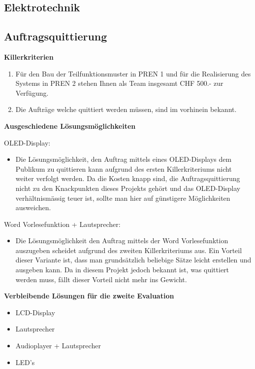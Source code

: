 \subsection{Elektrotechnik}

\subsection{Auftragsquittierung}
\textbf{Killerkriterien}
\begin{enumerate} 
    \item Für den Bau der Teilfunktionsmuster in PREN 1 und für die Realisierung des Systems in PREN 2 stehen Ihnen als Team insgesamt CHF 500.- zur Verfügung. 
	\item Die Aufträge welche quittiert werden müssen, sind im vorhinein bekannt.
\end{enumerate}

\textbf{Ausgeschiedene Lösungsmöglichkeiten} 

OLED-Display:
\begin{itemize}
    \item Die Lösungsmöglichkeit, den Auftrag mittels eines OLED-Displays dem Publikum zu quittieren kann aufgrund des ersten Killerkriteriums nicht weiter verfolgt werden. Da die Kosten knapp sind, die Auftragsquittierung nicht zu den Knackpunkten dieses Projekts gehört und das OLED-Display verhältnismässig teuer ist, sollte man hier auf günstigere Möglichkeiten ausweichen.
\end{itemize}

Word Vorlesefunktion + Lautsprecher:
\begin{itemize}
    \item Die Lösungsmöglichkeit den Auftrag mittels der Word Vorlesefunktion auszugeben scheidet aufgrund des zweiten Killerkriteriums aus. Ein Vorteil dieser Variante ist, dass man grundsätzlich beliebige Sätze leicht erstellen und ausgeben kann. Da in diesem Projekt jedoch bekannt ist, was quittiert werden muss, fällt dieser Vorteil nicht mehr ins Gewicht.
\end{itemize}

\textbf{Verbleibende Lösungen für die zweite Evaluation}
\begin{itemize}
    \item LCD-Display
    \item Lautsprecher
    \item Audioplayer + Lautsprecher
    \item LED's
\end{itemize}

